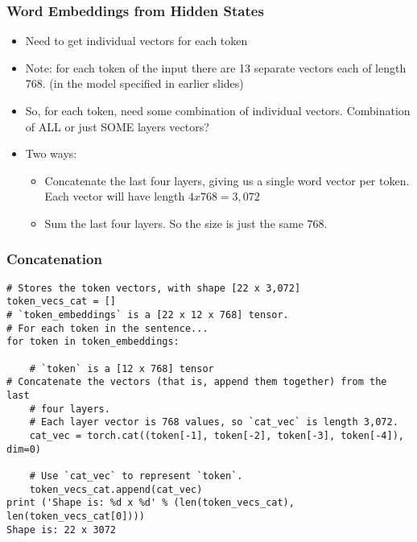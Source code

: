\begin{frame}[fragile]\frametitle{Word Embeddings from Hidden States}

\begin{itemize}
\item Need to get individual vectors for each token
\item Note: for each token of the input there are 13 separate vectors each of length 768. (in the model specified in earlier slides)
\item So, for each token, need some combination of individual vectors. Combination of ALL or just SOME layers vectors?
\item Two ways:
\begin{itemize}
\item Concatenate the last four layers, giving us a single word vector per token. Each vector will have length $4 x 768 = 3,072$
\item Sum the last four layers. So the size is just the same $768$.
\end{itemize}
\end{itemize}
\end{frame}

\begin{frame}[fragile]\frametitle{Concatenation}


\begin{lstlisting}
# Stores the token vectors, with shape [22 x 3,072]
token_vecs_cat = []
# `token_embeddings` is a [22 x 12 x 768] tensor.
# For each token in the sentence...
for token in token_embeddings:
    
    # `token` is a [12 x 768] tensor
# Concatenate the vectors (that is, append them together) from the last 
    # four layers.
    # Each layer vector is 768 values, so `cat_vec` is length 3,072.
    cat_vec = torch.cat((token[-1], token[-2], token[-3], token[-4]), dim=0)
    
    # Use `cat_vec` to represent `token`.
    token_vecs_cat.append(cat_vec)
print ('Shape is: %d x %d' % (len(token_vecs_cat), len(token_vecs_cat[0])))
Shape is: 22 x 3072
\end{lstlisting}

\end{frame}

